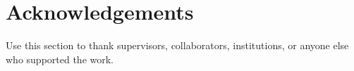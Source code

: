 
\chapter*{Acknowledgements}

Use this section to thank supervisors, collaborators, institutions, or anyone
else who supported the work.